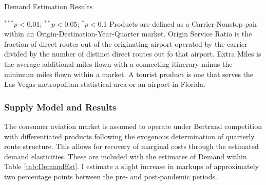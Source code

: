 \documentclass{article}
\begin{document}
    \begin{table}
        \caption{Demand Estimation Results}
        \label{tab:DemandEst}
        \vspace{-15mm}
        \begin{center}
        
                \footnotesize{$^{***}p<0.01$; $^{**}p<0.05$; $^{*}p<0.1$ Products are defined as a Carrier-Nonstop pair within an Origin-Destination-Year-Quarter market. Origin Service Ratio is the fraction of direct routes out of the originating airport operated by the carrier divided by the number of distinct direct routes out fo that airport. Extra Miles is the average additional miles flown with a connecting itinerary minus the minimum miles flown within a market.  A tourist product is one that serves the Las Vegas metropolitan statistical area or an airport in Florida.}

        \end{center}
    \end{table}
		
	\subsubsection{Supply Model and Results}
	\label{sec:Analysis_Supply}
	The consumer aviation market is assumed to operate under Bertrand competition with differentiated products following the exogenous determination of quarterly route structure. This allows for recovery of marginal costs through the estimated demand elasticities.  These are included with the estimates of Demand within Table \ref{tab:DemandEst}. I estimate a slight increase in markups of approximately two percentage points between the pre- and post-pandemic periods. 
	
	
\end{document}
